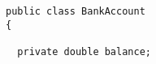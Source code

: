 \documentclass[12pt]{article}
\begin{document}
\begin{enumerate}











\newpage

\begin{figure}[t]

\footnotesize{
\begin{verbatim}
public class BankAccount
{

  private double balance;


\end{verbatim}}
\end{figure}
\end{enumerate}
\end{document}
